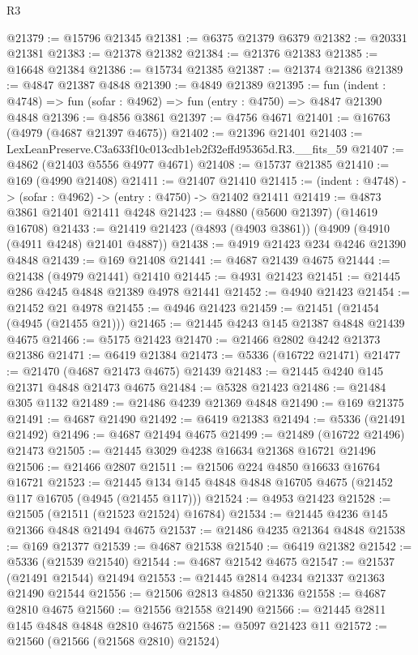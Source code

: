 \begin{lexlean}{R3}
\begin{coremodule}
@21379 := @15796 @21345
@21381 := @6375 @21379 @6379
@21382 := @20331 @21381
@21383 := @21378 @21382
@21384 := @21376 @21383
@21385 := @16648 @21384
@21386 := @15734 @21385
@21387 := @21374 @21386
@21389 := @4847 @21387 @4848
@21390 := @4849 @21389
@21395 := fun (indent : @4748) => fun (sofar : @4962) => fun (entry : @4750) => @4847 @21390 @4848
@21396 := @4856 @3861
@21397 := @4756 @4671
@21401 := @16763 (@4979 (@4687 @21397 @4675))
@21402 := @21396 @21401
@21403 := LexLeanPreserve.C3a633f10c013cdb1eb2f32effd95365d.R3.__fits_59
@21407 := @4862 (@21403 @5556 @4977 @4671)
@21408 := @15737 @21385
@21410 := @169 (@4990 @21408)
@21411 := @21407 @21410
@21415 := (indent : @4748) -> (sofar : @4962) -> (entry : @4750) -> @21402 @21411
@21419 := @4873 @3861 @21401 @21411 @4248
@21423 := @4880 (@5600 @21397) (@14619 @16708)
@21433 := @21419 @21423 (@4893 (@4903 @3861)) (@4909 (@4910 (@4911 @4248) @21401 @4887))
@21438 := @4919 @21423 @234 @4246 @21390 @4848
@21439 := @169 @21408
@21441 := @4687 @21439 @4675
@21444 := @21438 (@4979 @21441) @21410
@21445 := @4931 @21423
@21451 := @21445 @286 @4245 @4848 @21389 @4978 @21441
@21452 := @4940 @21423
@21454 := @21452 @21 @4978
@21455 := @4946 @21423
@21459 := @21451 (@21454 (@4945 (@21455 @21)))
@21465 := @21445 @4243 @145 @21387 @4848 @21439 @4675
@21466 := @5175 @21423
@21470 := @21466 @2802 @4242 @21373 @21386
@21471 := @6419 @21384
@21473 := @5336 (@16722 @21471)
@21477 := @21470 (@4687 @21473 @4675) @21439
@21483 := @21445 @4240 @145 @21371 @4848 @21473 @4675
@21484 := @5328 @21423
@21486 := @21484 @305 @1132
@21489 := @21486 @4239 @21369 @4848
@21490 := @169 @21375
@21491 := @4687 @21490
@21492 := @6419 @21383
@21494 := @5336 (@21491 @21492)
@21496 := @4687 @21494 @4675
@21499 := @21489 (@16722 @21496) @21473
@21505 := @21445 @3029 @4238 @16634 @21368 @16721 @21496
@21506 := @21466 @2807
@21511 := @21506 @224 @4850 @16633 @16764 @16721
@21523 := @21445 @134 @145 @4848 @4848 @16705 @4675 (@21452 @117 @16705 (@4945 (@21455 @117)))
@21524 := @4953 @21423
@21528 := @21505 (@21511 (@21523 @21524) @16784)
@21534 := @21445 @4236 @145 @21366 @4848 @21494 @4675
@21537 := @21486 @4235 @21364 @4848
@21538 := @169 @21377
@21539 := @4687 @21538
@21540 := @6419 @21382
@21542 := @5336 (@21539 @21540)
@21544 := @4687 @21542 @4675
@21547 := @21537 (@21491 @21544) @21494
@21553 := @21445 @2814 @4234 @21337 @21363 @21490 @21544
@21556 := @21506 @2813 @4850 @21336
@21558 := @4687 @2810 @4675
@21560 := @21556 @21558 @21490
@21566 := @21445 @2811 @145 @4848 @4848 @2810 @4675
@21568 := @5097 @21423 @11
@21572 := @21560 (@21566 (@21568 @2810) @21524)

\end{coremodule}
\end{lexlean}
